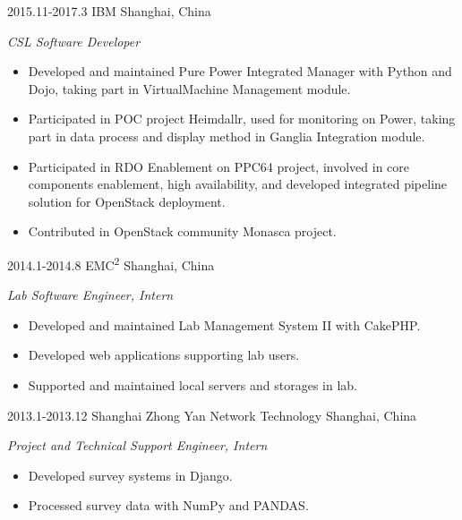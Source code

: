 \documentclass[]{friggeri-cv} %
\begin{document}
\begin{entrylist}
	\entry
	{2015.11-2017.3}
	{IBM}
	{Shanghai, China}
	{\emph{CSL Software Developer}
		\begin{itemize}
			\item Developed and maintained Pure Power Integrated Manager with Python and Dojo, taking part in VirtualMachine Management module.
			\item Participated in POC project Heimdallr, used for monitoring on Power, taking part in data process and display method in Ganglia Integration module.
			\item Participated in RDO Enablement on PPC64 project, involved in core components enablement, high availability, and developed integrated pipeline solution for OpenStack deployment.
			\item Contributed in OpenStack community Monasca project.
		\end{itemize}
	}
	\entry
	{2014.1-2014.8}
	{EMC\textsuperscript{2}}
	{Shanghai, China}
	{\emph{Lab Software Engineer, Intern}
		\begin{itemize}
			\item Developed and maintained Lab Management System II with CakePHP.
			\item Developed web applications supporting lab users.
			\item Supported and maintained local servers and storages in lab.
		\end{itemize}
	}
	\entry
	{2013.1-2013.12}
	{Shanghai Zhong Yan Network Technology}
	{Shanghai, China}
	{\emph{Project and Technical Support Engineer, Intern}
		\begin{itemize}
			\item Developed survey systems in Django.
			\item Processed survey data with NumPy and PANDAS.
		\end{itemize}
	}
\end{entrylist}


%
\end{document}
